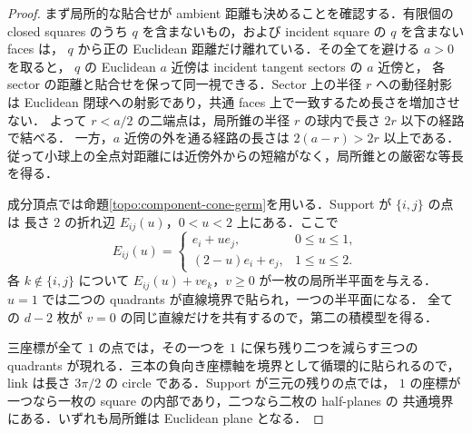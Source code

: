 \begin{proof}
まず局所的な貼合せが ambient 距離も決めることを確認する．有限個の closed squares
のうち $q$ を含まないもの，および incident square の $q$ を含まない faces は，
$q$ から正の Euclidean 距離だけ離れている．その全てを避ける $a>0$ を取ると，
$q$ の Euclidean $a$ 近傍は incident tangent sectors の $a$ 近傍と，
各 sector の距離と貼合せを保って同一視できる．Sector 上の半径 $r$ への動径射影は
Euclidean 閉球への射影であり，共通 faces 上で一致するため長さを増加させない．
よって $r<a/2$ の二端点は，局所錐の半径 $r$ の球内で長さ $2r$ 以下の経路で結べる．
一方，$a$ 近傍の外を通る経路の長さは $2(a-r)>2r$ 以上である．
従って小球上の全点対距離には近傍外からの短縮がなく，局所錐との厳密な等長を得る．

成分頂点では命題\ref{topo:component-cone-germ}を用いる．Support が $\{i,j\}$ の点は
長さ $2$ の折れ辺 $E_{ij}(u)$，$0<u<2$ 上にある．ここで
\[
 E_{ij}(u)=\begin{cases}e_i+u e_j,&0\le u\le1,\\
                      (2-u)e_i+e_j,&1\le u\le2.\end{cases}
\]
各 $k\notin\{i,j\}$ について $E_{ij}(u)+v e_k$，$v\ge0$ が一枚の局所半平面を与える．
$u=1$ では二つの quadrants が直線境界で貼られ，一つの半平面になる．
全ての $d-2$ 枚が $v=0$ の同じ直線だけを共有するので，第二の積模型を得る．

三座標が全て $1$ の点では，その一つを $1$ に保ち残り二つを減らす三つの
quadrants が現れる．三本の負向き座標軸を境界として循環的に貼られるので，
link は長さ $3\pi/2$ の circle である．Support が三元の残りの点では，
$1$ の座標が一つなら一枚の square の内部であり，二つなら二枚の half-planes の
共通境界にある．いずれも局所錐は Euclidean plane となる．
\end{proof}


